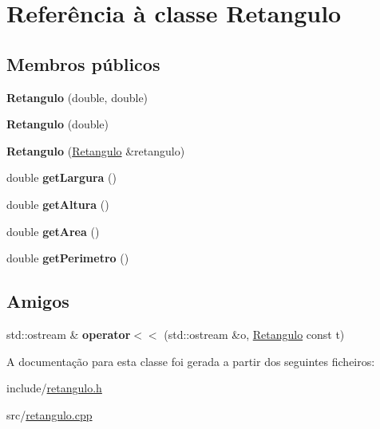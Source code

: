 \hypertarget{classRetangulo}{\section{Referência à classe Retangulo}
\label{classRetangulo}
}
\subsection*{Membros públicos}
\begin{DoxyCompactItemize}
\item 
\hypertarget{classRetangulo_a53924aa08a590ced5fd71b679074d9b5}{{\bfseries Retangulo} (double, double)}\label{classRetangulo_a53924aa08a590ced5fd71b679074d9b5}

\item 
\hypertarget{classRetangulo_a156586e01e5b1773a2afda2d7f579ac5}{{\bfseries Retangulo} (double)}\label{classRetangulo_a156586e01e5b1773a2afda2d7f579ac5}

\item 
\hypertarget{classRetangulo_a8e2b87c39bf41b85ed47c21a792fd944}{{\bfseries Retangulo} (\hyperlink{classRetangulo}{Retangulo} \&retangulo)}\label{classRetangulo_a8e2b87c39bf41b85ed47c21a792fd944}

\item 
\hypertarget{classRetangulo_ae91e4d6741207083b7f739700c93ed08}{double {\bfseries get\-Largura} ()}\label{classRetangulo_ae91e4d6741207083b7f739700c93ed08}

\item 
\hypertarget{classRetangulo_ad92903faddbc0ca108767d63f487b783}{double {\bfseries get\-Altura} ()}\label{classRetangulo_ad92903faddbc0ca108767d63f487b783}

\item 
\hypertarget{classRetangulo_a812b0d76c251f4b4fff663afcf4f5cf9}{double {\bfseries get\-Area} ()}\label{classRetangulo_a812b0d76c251f4b4fff663afcf4f5cf9}

\item 
\hypertarget{classRetangulo_a679906878f7f23fa4eea8a503dc46873}{double {\bfseries get\-Perimetro} ()}\label{classRetangulo_a679906878f7f23fa4eea8a503dc46873}

\end{DoxyCompactItemize}
\subsection*{Amigos}
\begin{DoxyCompactItemize}
\item 
\hypertarget{classRetangulo_adbd4af250bfb38cd19a46ad33779c59f}{std\-::ostream \& {\bfseries operator$<$$<$} (std\-::ostream \&o, \hyperlink{classRetangulo}{Retangulo} const t)}\label{classRetangulo_adbd4af250bfb38cd19a46ad33779c59f}

\end{DoxyCompactItemize}


A documentação para esta classe foi gerada a partir dos seguintes ficheiros\-:\begin{DoxyCompactItemize}
\item 
include/\hyperlink{retangulo_8h}{retangulo.\-h}\item 
src/\hyperlink{retangulo_8cpp}{retangulo.\-cpp}\end{DoxyCompactItemize}
